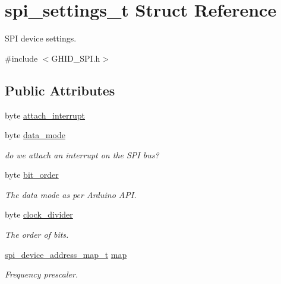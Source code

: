 \hypertarget{structspi__settings__t}{\section{spi\-\_\-settings\-\_\-t \-Struct \-Reference}
\label{structspi__settings__t}
}


\-S\-P\-I device settings.  




{\ttfamily \#include $<$\-G\-H\-I\-D\-\_\-\-S\-P\-I.\-h$>$}

\subsection*{\-Public \-Attributes}
\begin{DoxyCompactItemize}
\item 
byte \hyperlink{structspi__settings__t_aae2ae572e8d94487413f68c2ed08295d}{attach\-\_\-interrupt}
\item 
byte \hyperlink{structspi__settings__t_a4ef3b51bb59cd49b4ad291443d2e3404}{data\-\_\-mode}
\begin{DoxyCompactList}\small\item\em do we attach an interrupt on the \-S\-P\-I bus? \end{DoxyCompactList}\item 
byte \hyperlink{structspi__settings__t_ab50d718a4ec202c4077ad3c5170f0864}{bit\-\_\-order}
\begin{DoxyCompactList}\small\item\em \-The data mode as per \-Arduino \-A\-P\-I. \end{DoxyCompactList}\item 
byte \hyperlink{structspi__settings__t_a3f4596147a36610d8173f4d8d9655a0b}{clock\-\_\-divider}
\begin{DoxyCompactList}\small\item\em \-The order of bits. \end{DoxyCompactList}\item 
\hyperlink{_g_h_i_d___s_p_i_8h_a9d51766baec84fc8f27a377fb7a1ace7}{spi\-\_\-device\-\_\-address\-\_\-map\-\_\-t} \hyperlink{structspi__settings__t_a177d7128802b522adf4b1b9748787fb5}{map}
\begin{DoxyCompactList}\small\item\em \-Frequency prescaler. \end{DoxyCompactList}\end{DoxyCompactItemize}


